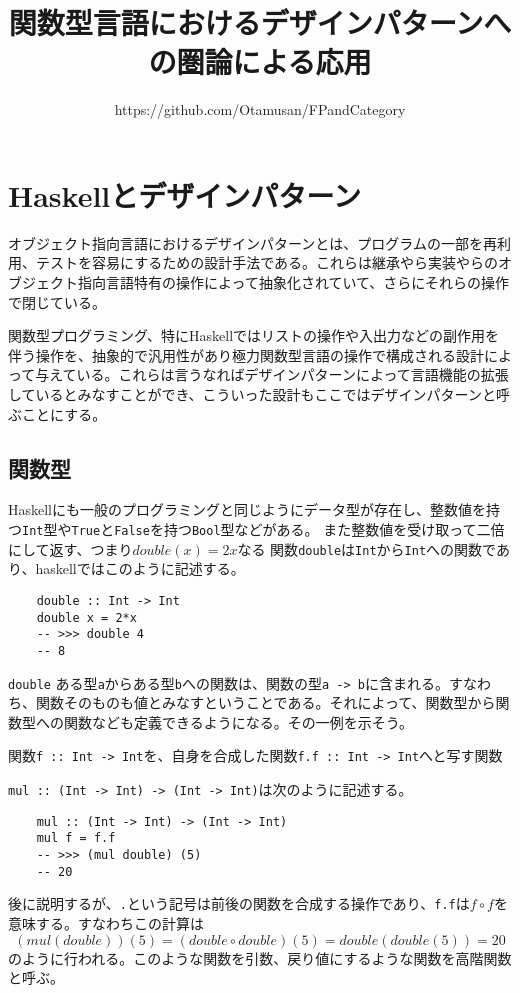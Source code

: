 \documentclass[uplatex,dvipdfmx]{jsarticle}
\newcommand{\pr}[1]{\colorbox[rgb]{0.9,0.9,0.9}{\lstinline{#1}}}
\newcommand{\functype}[2]{\pr{#1 -> #2}}
\newcommand{\fpmor}[3]{\pr{#1 :: #2 -> #3}}
\begin{document}
  \title{関数型言語におけるデザインパターンへの圏論による応用}
  \author{https://github.com/Otamusan/FPandCategory}
  \maketitle
	\tableofcontents
  \pagebreak
  \section{Haskellとデザインパターン}
  オブジェクト指向言語におけるデザインパターンとは、プログラムの一部を再利用、テストを容易にするための設計手法である。これらは継承やら実装やらのオブジェクト指向言語特有の操作によって抽象化されていて、さらにそれらの操作で閉じている。

  関数型プログラミング、特にHaskellではリストの操作や入出力などの副作用を伴う操作を、抽象的で汎用性があり極力関数型言語の操作で構成される設計によって与えている。これらは言うなればデザインパターンによって言語機能の拡張しているとみなすことができ、こういった設計もここではデザインパターンと呼ぶことにする。

  \subsection{関数型}
  Haskellにも一般のプログラミングと同じようにデータ型が存在し、整数値を持つ\pr{Int}型や\pr{True}と\pr{False}を持つ\pr{Bool}型などがある。
  また整数値を受け取って二倍にして返す、つまり$double(x)=2x$なる
  関数\pr{double}は\pr{Int}から\pr{Int}への関数であり、haskellではこのように記述する。
  \begin{lstlisting}
    double :: Int -> Int
    double x = 2*x
    -- >>> double 4
    -- 8
  \end{lstlisting}
  \lstinline{double}
  ある型\pr{a}からある型\pr{b}への関数は、関数の型\functype{a}{b}に含まれる。すなわち、関数そのものも値とみなすということである。それによって、関数型から関数型への関数なども定義できるようになる。その一例を示そう。

  関数\fpmor{f}{Int}{Int}を、自身を合成した関数\fpmor{f.f}{Int}{Int}へと写す関数
  
  \fpmor{mul}{(Int -> Int)}{(Int -> Int)}は次のように記述する。
  \begin{lstlisting}
    mul :: (Int -> Int) -> (Int -> Int)
    mul f = f.f
    -- >>> (mul double) (5)
    -- 20
  \end{lstlisting}
  後に説明するが、\pr{.}という記号は前後の関数を合成する操作であり、\pr{f.f}は$f\circ f$を意味する。すなわちこの計算は
  \[(mul(double))(5)=(double \circ double)(5)=double(double(5))=20\]のように行われる。このような関数を引数、戻り値にするような関数を高階関数と呼ぶ。
  
\end{document}
